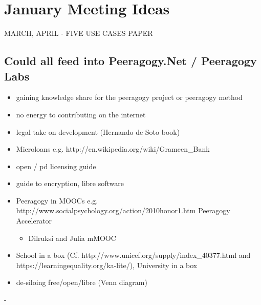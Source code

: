 \section{January Meeting Ideas}

MARCH, APRIL - FIVE USE CASES PAPER

\subsection{Could all feed into Peeragogy.Net / Peeragogy Labs}
\begin{itemize}
\item gaining knowledge share for the peeragogy project or peeragogy method 
\item no energy to contributing on the internet 
\item legal take on development (Hernando de Soto book) 
\item Microloans e.g. http://en.wikipedia.org/wiki/Grameen_Bank 
\item open / pd licensing guide 
\item guide to encryption, libre software 
\item Peeragogy in MOOCs e.g. http://www.socialpsychology.org/action/2010honor1.htm Peeragogy Accelerator 
\begin{itemize}
\item Dilruksi and Julia mMOOC
\end{itemize}
\item School in a box (Cf. http://www.unicef.org/supply/index_40377.html and https://learningequality.org/ka-lite/), University in a box
\item de-siloing free/open/libre (Venn diagram)
\end{itemize}
  - 